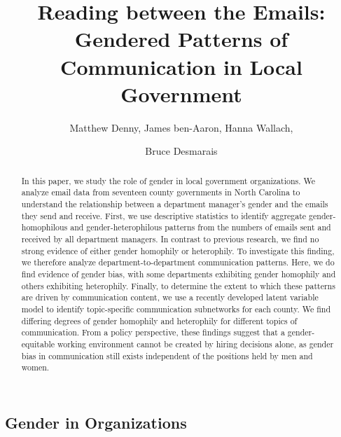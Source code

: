 \documentclass{pnastwo}
\begin{document}
\title{Reading between the Emails: Gendered Patterns of Communication in Local Government}

\author{
Matthew Denny,
James ben-Aaron,
Hanna Wallach,
\and Bruce Desmarais
}

\contributor{\vspace{-.25cm}}


\maketitle

%
\begin{article}
\begin{abstract}
	
{In this paper, we study the role of gender in local government
organizations. We analyze email data from seventeen county
governments in North Carolina to understand the relationship
between a department manager's gender and the emails they send
and receive. First, we use descriptive statistics to identify
aggregate gender-homophilous and gender-heterophilous patterns
from the numbers of emails sent and received by all department
managers. In contrast to previous research, we find no strong
evidence of either gender homophily or heterophily. To
investigate this finding, we therefore analyze
department-to-department communication patterns. Here, we do find
evidence of gender bias, with some departments exhibiting gender
homophily and others exhibiting heterophily. Finally, to
determine the extent to which these patterns are driven by
communication content, we use a recently developed latent
variable model to identify topic-specific communication
subnetworks for each county. We find differing degrees of gender
homophily and heterophily for different topics of
communication. From a policy perspective, these findings suggest
that a gender-equitable working environment cannot be created by
hiring decisions alone, as gender bias in communication still
exists independent of the positions held by men and women.
}
\end{abstract} 



\section{Gender in Organizations}


\end{article}
\end{document}
